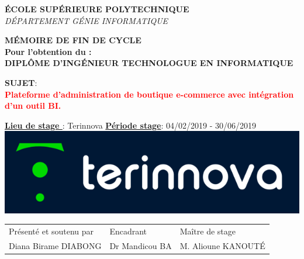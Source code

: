 \documentclass[a4paper, 12pt]{report}
\begin{document}
\begin{titlepage}
\textsc{\small \textbf{ÉCOLE SUPÉRIEURE POLYTECHNIQUE}}\\[0.15cm] %
\textsc{\small {\textit {DÉPARTEMENT GÉNIE INFORMATIQUE}}}\\[0.15cm] %

\begin{tcolorbox}[colback=white,colframe=myblue]
\centering
 \textcolor{myblue}{\small{\textbf{MÉMOIRE DE FIN DE CYCLE}}}\\
\small{\textbf{Pour l’obtention du :} \\
\textbf{DIPLÔME D'INGÉNIEUR TECHNOLOGUE EN INFORMATIQUE}} %
\end{tcolorbox}

\begin{tcolorbox}[colback=white,colframe=myblue]
\centering
\textbf{\small{SUJET}}: \\
\textcolor{red}{\textbf {Plateforme d'administration de boutique e-commerce avec intégration d'un outil BI.}} %
\end{tcolorbox}

 

\begin{tcolorbox}[colback=white,colframe=myblue]
\small{\textbf{\underline{Lieu de stage }}: \textcolor{myblue}{Terinnova} \quad \textbf{\underline{Période stage}}: \textcolor{myblue}{04/02/2019 - 30/06/2019}}\\
\centering \newline
\includegraphics[scale=.6]{img/terinnova.png} %
\end{tcolorbox}

\begin{tcolorbox}[colback=white,colframe=myblue]
\begin{tabular}{lll}
Présenté et soutenu par & Encadrant & Maître de stage\\
Diana Birame DIABONG & Dr Mandicou BA & M. Alioune KANOUTÉ
\end{tabular}
\end{tcolorbox}



\end{titlepage}
\end{document}
